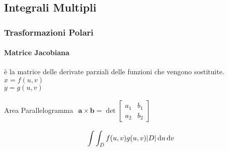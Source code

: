 \subsection{Integrali Multipli}
\subsubsection{Trasformazioni Polari}
\paragraph{Matrice Jacobiana} è la matrice delle derivate parziali delle funzioni che vengono sostituite.\\
$x = f(u,v)$\\
$y = g(u,v)$

Area Parallelogramma
\begin{math}
\displaystyle {
\begin{aligned}\mathbf {a} \times \mathbf {b} = \det{
	\begin{bmatrix}
		a_{1} & b_{1}\\
		a_{2} & b_{2}
	\end{bmatrix}
	}
\end{aligned}
}
\end{math}

\begin{equation}
	\int\int_{D} f(u,v) g(u,v)|D|\,\mathrm{d} u \,\mathrm{d} v
\end{equation}

